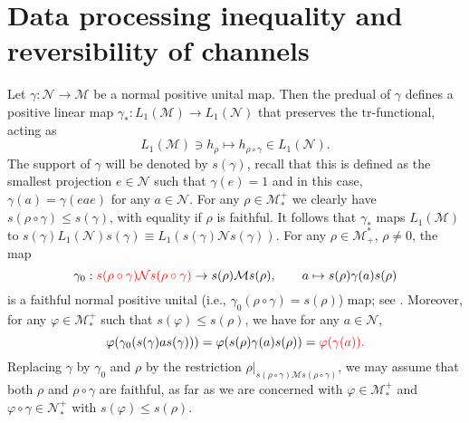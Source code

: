 \documentclass[12pt]{article}
\theoremstyle{definition}
\theoremstyle{remark}
\numberwithin{equation}{section}
\def\Me{\mathcal M}
\def\Ne{\mathcal N}
\def\Tr{\mathrm{tr}}
\def\ffi{\varphi}
\begin{document}
\section{Data processing inequality and reversibility of channels}

Let  $\gamma: \Ne\to \Me$ be a normal positive unital map. Then the  predual of $\gamma$  defines a 
positive linear map $\gamma_*: L_1(\Me)\to L_1(\Ne)$ that preserves the {\color{red}$\Tr$-functional,}
acting as
\[
L_1(\Me)\ni h_\rho\mapsto h_{\rho\circ\gamma} \in L_1(\Ne).
\]
The support
of $\gamma$ will be denoted by $s(\gamma)$, recall that this is defined as the smallest projection
$e\in \Ne$ such that $\gamma(e)=1$ and in this case, $\gamma(a)=\gamma(eae)$ for any $a\in
\Ne$. For any $\rho\in \Me_*^+$ we clearly have
$s(\rho\circ\gamma)\le s(\gamma)$, with equality if $\rho$ is faithful. 
It follows that $\gamma_*$ maps $L_1(\Me)$ to $s(\gamma)L_1(\Ne)s(\gamma)\equiv
L_1(s(\gamma)\Ne s(\gamma))$.  For any $\rho\in \Me_+^*$, $\rho\ne 0$, the map
\[
\gamma_0: {\color{red}s(\rho\circ\gamma)\Ne s(\rho\circ\gamma)}\to s(\rho)\Me s(\rho),
\qquad a\mapsto s(\rho) \gamma(a)s(\rho)
\]
is a faithful normal positive unital {\color{red}(i.e., $\gamma_0(\rho\circ\gamma)=s(\rho)$)} map;
{\color{red}see \cite[Remark 6.7]{hiai2021lectures}.} Moreover, for any $\ffi\in \Me_*^+$ such that
$s(\ffi)\le s(\rho)$, we have for any $a\in \Ne$,
\[
\ffi(\gamma_0(s(\gamma)as(\gamma)))=\ffi(s(\rho)\gamma(a)s(\rho))={\color{red}\ffi(\gamma(a)).}
\]
Replacing $\gamma$ by $\gamma_0$ and $\rho$ by the restriction
{\color{red}$\rho|_{s(\rho\circ\gamma)\Me s(\rho\circ\gamma)}$,} we may  assume that both $\rho$
and $\rho\circ\gamma$ are faithful, {\color{red}as far as we are concerned with $\ffi\in\Me_*^+$ and
$\ffi\circ\gamma\in\Ne_*^+$ with $s(\ffi)\le s(\rho)$.}
\end{document}
